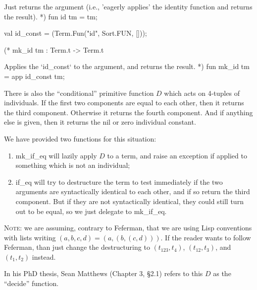 Just returns the argument (i.e., 'eagerly applies' the
identity function and returns the result). *)
fun id tm = tm;

val id_const = (Term.Fun("id", Sort.FUN, []));

(* mk_id tm : Term.t -> Term.t

Applies the `id_const` to the argument, and returns the
result. *)
fun mk_id tm = app id_const tm;
\eatline
{}\nwendcode{}\nwdocspar
\begin{node}
There is also the ``conditional'' primitive function $D$ which acts on
4-tuples of individuals. If the first two components are equal to each
other, then it returns the third component. Otherwise it returns the
fourth component. And if anything else is given, then it returns the
{\Tt{}nil\nwendquote} or {\Tt{}zero\nwendquote} individual constant.

We have provided two functions for this situation:
\begin{enumerate}
\item {\Tt{}mk{\_}if{\_}eq\nwendquote} will lazily apply $D$ to a term, and raise an
  exception if applied to something which is not an individual;
\item {\Tt{}if{\_}eq\nwendquote} will try to destructure the term to test immediately
  if the two arguments are syntactically identical to each other, and
  if so return the third component. But if they are not syntactically
  identical, they could still turn out to be equal, so we just
  delegate to {\Tt{}mk{\_}if{\_}eq\nwendquote}.
\end{enumerate}
\textsc{Note}: we are assuming, contrary to Feferman, that we are
using Lisp conventions with lists writing
$(a,b,c,d)=(a,(b,(c,d)))$. If the reader wants to follow Feferman,
than just change the destructuring to $(t_{123},t_{4})$,
$(t_{12},t_{3})$, and $(t_{1},t_{2})$ instead.

In his PhD thesis, Sean Matthews (Chapter 3, \S2.1) refers to this $D$
as the ``decide'' function.
\end{node}


